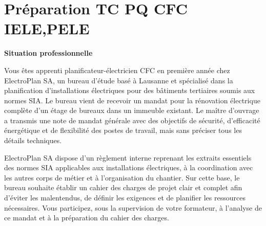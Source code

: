 \documentclass[a4paper,12pt,answers,addpoints]{exam}
\begin{document}
	\unframedsolutions
	\pointsinmargin
	\bracketedpoints
	
	\section*{Préparation TC PQ CFC IELE,PELE}


	
	\begin{questions}
		
		
		\textbf{Situation professionnelle}
		
		Vous êtes apprenti planificateur-électricien CFC en première année chez ElectroPlan SA, un bureau d'étude basé à Lausanne et spécialisé dans la planification d'installations électriques pour des bâtiments tertiaires soumis aux normes SIA. Le bureau vient de recevoir un mandat pour la rénovation électrique complète d'un étage de bureaux dans un immeuble existant. Le maître d'ouvrage a transmis une note de mandat générale avec des objectifs de sécurité, d'efficacité énergétique et de flexibilité des postes de travail, mais sans préciser tous les détails techniques.  
		
		ElectroPlan SA dispose d'un règlement interne reprenant les extraits essentiels des normes SIA applicables aux installations électriques, à la coordination avec les autres corps de métier et à l'organisation du chantier. Sur cette base, le bureau souhaite établir un cahier des charges de projet clair et complet afin d'éviter les malentendus, de définir les exigences et de planifier les ressources nécessaires. Vous participez, sous la supervision de votre formateur, à l'analyse de ce mandat et à la préparation du cahier des charges.
		
\end{questions}
\end{document}
